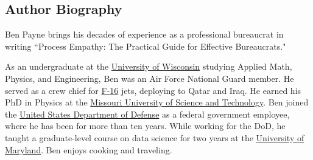\begin{center}
\section*{Author Biography}
\end{center}

Ben Payne brings his decades of experience as a professional bureaucrat in writing ``Process Empathy: The Practical Guide for Effective Bureaucrats."

As an undergraduate at the 
\href{https://en.wikipedia.org/wiki/University_of_Wisconsin\%E2\%80\%93Madison}{University of Wisconsin} studying 
Applied Math, Physics, and Engineering, 
Ben was an Air Force National Guard member. He served as a crew chief for 
\href{https://en.wikipedia.org/wiki/General_Dynamics_F-16_Fighting_Falcon}{F-16} jets, deploying to Qatar and Iraq.
He earned his PhD in Physics at the 
\href{https://en.wikipedia.org/wiki/Missouri_University_of_Science_and_Technology}{Missouri University of Science and Technology}. Ben joined the 
\href{https://en.wikipedia.org/wiki/United_States_Department_of_Defense}{United States Department of Defense} as a federal government employee, where he has been for more than ten years. While working for the DoD, he taught a graduate-level course on data science for two years at the 
\href{https://en.wikipedia.org/wiki/University_of_Maryland,_Baltimore_County}{University of Maryland}. Ben enjoys cooking and traveling. 

